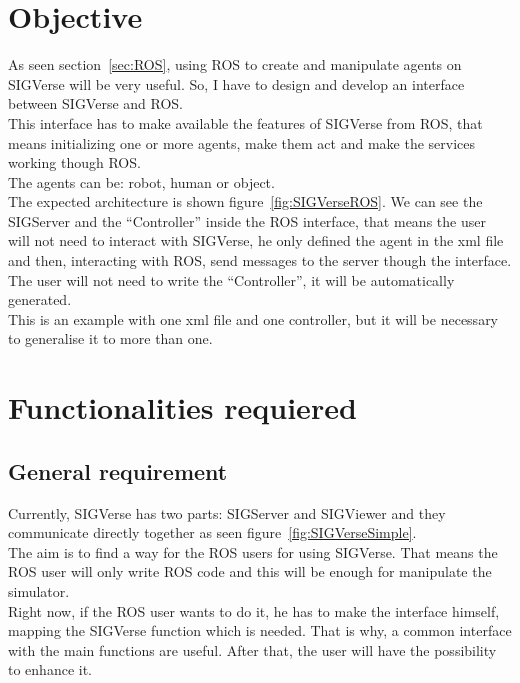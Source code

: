 \section{Objective}
As seen section~\ref{sec:ROS}, using ROS to create and manipulate agents on SIGVerse will be very useful. So, I have to design and develop an interface between SIGVerse and ROS.\\
This interface has to make available the features of SIGVerse from ROS, that means initializing one or more agents, make them act and make the services working though ROS.\\
The agents can be: robot, human or object.\\
The expected architecture is shown figure~\ref{fig:SIGVerseROS}. We can see the SIGServer and the ``Controller'' inside the ROS interface, that means the user will not need to interact with SIGVerse, he only defined the agent in the xml file and then, interacting with ROS, send messages to the server though the interface. The user will not need to write the ``Controller'', it will be automatically generated.\\
This is an example with one xml file and one controller, but it will be necessary to generalise it to more than one.

\noindent\begin{minipage}{\linewidth}%
\label{fig:SIGVerseROS}%
\end{minipage}

\section{Functionalities requiered}
\subsection{General requirement} %
Currently, SIGVerse has two parts: SIGServer and SIGViewer and they communicate directly together as seen figure~\ref{fig:SIGVerseSimple}.\\
The aim is to find a way for the ROS users for using SIGVerse. That means the ROS user will only write ROS code and this will be enough for manipulate the simulator.\\
Right now, if the ROS user wants to do it, he has to make the interface himself, mapping the SIGVerse function which is needed. That is why, a common interface with the main functions are useful. After that, the user will have the possibility to enhance it.\\


